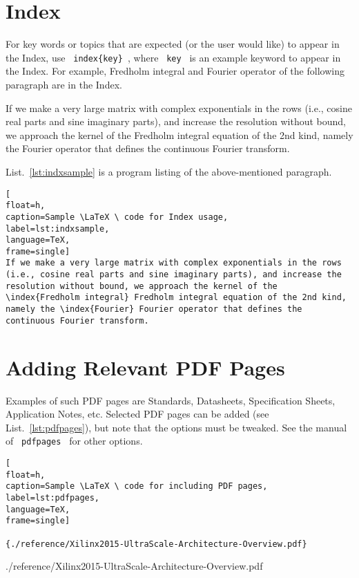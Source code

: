 \cleardoublepage









\newpage
\section{Index}

For key words or topics that are expected (or the user would like) to appear in the Index, use \verb| index{key} |, where  \verb| key | is an example keyword to appear in the Index. For example, Fredholm integral and Fourier operator of the following paragraph are in the Index.

If we make a very large matrix with complex exponentials in the rows (i.e., cosine real parts and sine imaginary parts), and increase the resolution without bound, we approach the kernel of the  Fredholm integral equation of the 2nd kind, namely the  Fourier operator that defines the continuous Fourier transform.

List.~\ref{lst:indxsample} is a program listing of the above-mentioned paragraph.

\begin{lstlisting}[
float=h,
caption=Sample \LaTeX \ code for Index usage, 
label=lst:indxsample,
language=TeX,
frame=single]
If we make a very large matrix with complex exponentials in the rows (i.e., cosine real parts and sine imaginary parts), and increase the resolution without bound, we approach the kernel of the \index{Fredholm integral} Fredholm integral equation of the 2nd kind, namely the \index{Fourier} Fourier operator that defines the continuous Fourier transform.
\end{lstlisting}
\cleardoublepage




\newpage
\section{Adding Relevant PDF Pages}

Examples of such PDF pages are Standards, Datasheets, Specification Sheets, Application Notes, etc.  Selected PDF pages can be added (see List.~\ref{lst:pdfpages}), but note that the options must be tweaked.  See the manual of \verb| pdfpages | for other options.

\begin{lstlisting}[
float=h,
caption=Sample \LaTeX \ code for including PDF pages, 
label=lst:pdfpages,
language=TeX,
frame=single]

{./reference/Xilinx2015-UltraScale-Architecture-Overview.pdf}
\end{lstlisting}
\cleardoublepage


{./reference/Xilinx2015-UltraScale-Architecture-Overview.pdf}